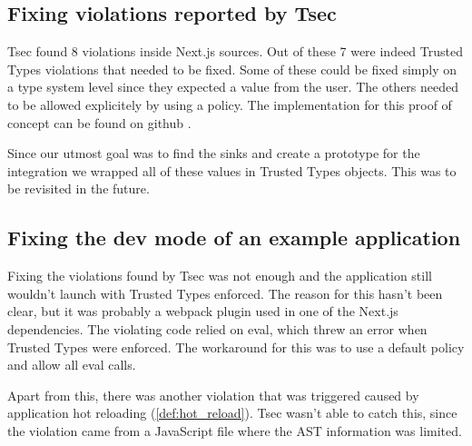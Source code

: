 \subsection{Fixing violations reported by Tsec}

Tsec found 8 violations \cite{tsec_output} inside Next.js sources. Out of these 7 were indeed
Trusted Types violations that needed to be fixed. Some of these could be fixed simply on a type
system level since they expected a value from the user. The others needed to be allowed explicitely
by using a policy. The implementation for this proof of concept can be found on github
\cite{nextjs_fix_tsec_violations_commit}.

Since our utmost goal was to find the sinks and create a prototype for the integration we wrapped
all of these values in Trusted Types objects. This was to be revisited in the future.

\subsection{Fixing the dev mode of an example application}

Fixing the violations found by Tsec was not enough and the application still wouldn't launch with
Trusted Types enforced. The reason for this hasn't been clear, but it was probably a webpack plugin
used in one of the Next.js dependencies. The violating code relied on eval, which threw an error
when Trusted Types were enforced. The workaround for this was to use a default policy and allow all
eval calls.

Apart from this, there was another violation that was triggered caused by application hot reloading
(\ref{def:hot_reload}). Tsec wasn't able to catch this, since the violation came from a JavaScript
file where the AST information was limited.
